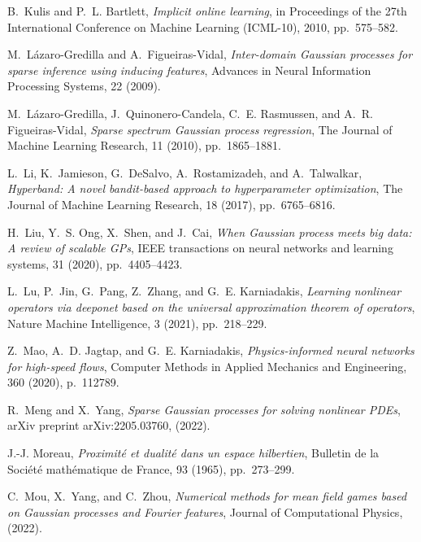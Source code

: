\documentclass[10pt,reqno]{amsart}
\newcommand{\1}{{\chi}}
\numberwithin{equation}{section}
\theoremstyle{thmlemcorr}
\numberwithin{theorem}{section}
\theoremstyle{thmlemcorr*}
\theoremstyle{defi}
\theoremstyle{remexample}
\theoremstyle{ass}
\begin{document}
\begin{thebibliography}{10}
	{\sc B.~Kulis and P.~L. Bartlett}, {\em Implicit online learning}, in
	Proceedings of the 27th International Conference on Machine Learning
	(ICML-10), 2010, pp.~575--582.
	
	{\sc M.~L{\'a}zaro-Gredilla and A.~Figueiras-Vidal}, {\em Inter-domain
		{G}aussian processes for sparse inference using inducing features}, Advances
	in Neural Information Processing Systems, 22 (2009).
	
	{\sc M.~L{\'a}zaro-Gredilla, J.~Quinonero-Candela, C.~E. Rasmussen, and A.~R.
		Figueiras-Vidal}, {\em Sparse spectrum {G}aussian process regression}, The
	Journal of Machine Learning Research, 11 (2010), pp.~1865--1881.
	
	{\sc L.~Li, K.~Jamieson, G.~DeSalvo, A.~Rostamizadeh, and A.~Talwalkar}, {\em
		Hyperband: A novel bandit-based approach to hyperparameter optimization}, The
	Journal of Machine Learning Research, 18 (2017), pp.~6765--6816.
	
	{\sc H.~Liu, Y.~S. Ong, X.~Shen, and J.~Cai}, {\em When {G}aussian process
		meets big data: A review of scalable {GP}s}, IEEE transactions on neural
	networks and learning systems, 31 (2020), pp.~4405--4423.
	
	{\sc L.~Lu, P.~Jin, G.~Pang, Z.~Zhang, and G.~E. Karniadakis}, {\em Learning
		nonlinear operators via deeponet based on the universal approximation theorem
		of operators}, Nature Machine Intelligence, 3 (2021), pp.~218--229.
	
	{\sc Z.~Mao, A.~D. Jagtap, and G.~E. Karniadakis}, {\em Physics-informed neural
		networks for high-speed flows}, Computer Methods in Applied Mechanics and
	Engineering, 360 (2020), p.~112789.
	
	{\sc R.~Meng and X.~Yang}, {\em Sparse {G}aussian processes for solving
		nonlinear {PDE}s}, arXiv preprint arXiv:2205.03760,  (2022).
	
	{\sc J.-J. Moreau}, {\em Proximit{\'e} et dualit{\'e} dans un espace
		hilbertien}, Bulletin de la Soci{\'e}t{\'e} math{\'e}matique de France, 93
	(1965), pp.~273--299.
	
	{\sc C.~Mou, X.~Yang, and C.~Zhou}, {\em Numerical methods for mean field games
		based on {G}aussian processes and {F}ourier features}, Journal of
	Computational Physics,  (2022).
	

\end{thebibliography}
\end{document}
